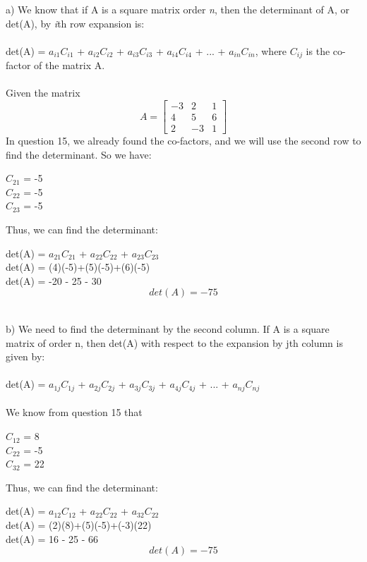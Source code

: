\documentclass[12pt,a4paper]{extarticle}
\begin{document}
a) We know that if A is a square matrix order \textit{n}, then the determinant of A, or det(A), by \textit{i}th 
row expansion is:
\\
\\
det(A) = $a_{i1}$$C_{i1}$ + $a_{i2}$$C_{i2}$ + $a_{i3}$$C_{i3}$ + $a_{i4}$$C_{i4}$ + ... + $a_{in}$$C_{in}$, 
where $C_{ij}$ is the co-factor of the matrix A.
\\
\\
Given the matrix
\[
	A = \begin{bmatrix}
		-3 & 2 & 1 \\
		4 & 5 & 6 \\
		2 & -3 & 1
	\end{bmatrix}
\]
In question 15, we already found the co-factors, and we will use
the second row to find the determinant. So we have:
\begin{center}
$C_{21}$ = -5 \\
$C_{22}$ = -5 \\
$C_{23}$ = -5
\end{center}
Thus, we can find the determinant:
\begin{center}
det(A) = $a_{21}$$C_{21}$ + $a_{22}$$C_{22}$ + $a_{23}$$C_{23}$\\
det(A) = (4)(-5)+(5)(-5)+(6)(-5) \\
det(A) = -20 - 25 - 30
\[
\boxed{det(A) = -75}
\]
\end{center}
\\
b) We need to find the determinant by the second column. If A is a square matrix of order n, then det(A) with 
respect to the expansion by jth column is given by:
\\
\\
det(A) = $a_{1j}$$C_{1j}$ + $a_{2j}$$C_{2j}$ + $a_{3j}$$C_{3j}$ + $a_{4j}$$C_{4j}$ + ... + $a_{nj}$$C_{nj}$
\\
\\
We know from question 15 that
\begin{center}
$C_{12}$ = 8 \\
$C_{22}$ = -5 \\
$C_{32}$ = 22
\end{center}
Thus, we can find the determinant:
\begin{center}
det(A) = $a_{12}$$C_{12}$ + $a_{22}$$C_{22}$ + $a_{32}$$C_{22}$\\
det(A) = (2)(8)+(5)(-5)+(-3)(22) \\
det(A) = 16 - 25 - 66
\[
\boxed{det(A) = -75}
\]
\end{center}
\newpage
\end{document}
